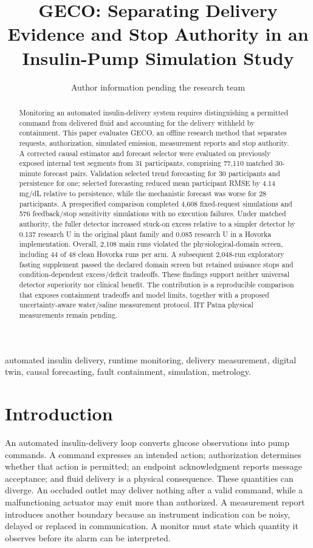 \documentclass[journal,10pt,letterpaper]{IEEEtran}
\begin{document}
\title{GECO: Separating Delivery Evidence and Stop Authority in an Insulin-Pump Simulation Study}
\author{Author information pending the research team}
\maketitle
\begin{abstract}Monitoring an automated insulin-delivery system requires distinguishing a permitted command from delivered fluid and accounting for the delivery withheld by containment. This paper evaluates GECO, an offline research method that separates requests, authorization, simulated emission, measurement reports and stop authority. A corrected causal estimator and forecast selector were evaluated on previously exposed internal test segments from 31 participants, comprising 77,110 matched 30-minute forecast pairs. Validation selected trend forecasting for 30 participants and persistence for one; selected forecasting reduced mean participant RMSE by 4.14 mg/dL relative to persistence, while the mechanistic forecast was worse for 28 participants. A prespecified comparison completed 4,608 fixed-request simulations and 576 feedback/stop sensitivity simulations with no execution failures. Under matched authority, the fuller detector increased stuck-on excess relative to a simpler detector by 0.137 research U in the original plant family and 0.085 research U in a Hovorka implementation. Overall, 2,108 main runs violated the physiological-domain screen, including 44 of 48 clean Hovorka runs per arm. A subsequent 2,048-run exploratory fasting supplement passed the declared domain screen but retained nuisance stops and condition-dependent excess/deficit tradeoffs. These findings support neither universal detector superiority nor clinical benefit. The contribution is a reproducible comparison that exposes containment tradeoffs and model limits, together with a proposed uncertainty-aware water/saline measurement protocol. IIT Patna physical measurements remain pending.\end{abstract}
\begin{IEEEkeywords}automated insulin delivery, runtime monitoring, delivery measurement, digital twin, causal forecasting, fault containment, simulation, metrology.\end{IEEEkeywords}
\section{Introduction}

An automated insulin-delivery loop converts glucose observations into
pump commands. A command expresses an intended action; authorization
determines whether that action is permitted; an endpoint acknowledgment
reports message acceptance; and fluid delivery is a physical
consequence. These quantities can diverge. An occluded outlet may
deliver nothing after a valid command, while a malfunctioning actuator
may emit more than authorized. A measurement report introduces another
boundary because an instrument indication can be noisy, delayed or
replaced in communication. A monitor must state which quantity it
observes before its alarm can be interpreted.
\end{document}

